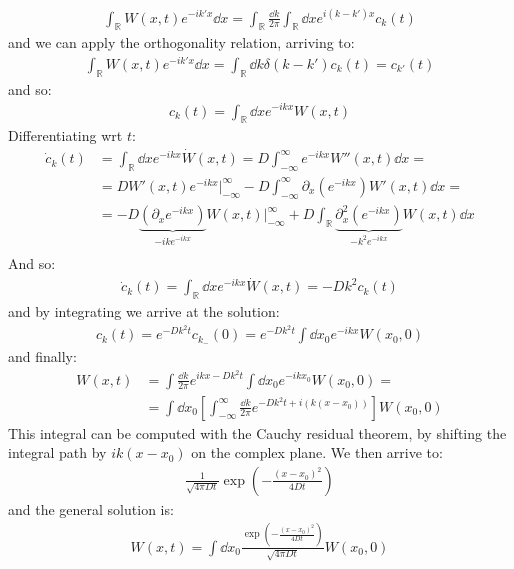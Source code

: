 \documentclass[../template.tex]{subfiles}
\begin{document}
\begin{align*}
    \int_{\mathbb{R}} W(x,t) e^{-ik'x} \dd{x} = \int_{\mathbb{R}} \frac{\dd{k}}{2\pi}  \int_{\mathbb{R}} \dd{x} e^{i(k-k')x} c_k(t)
\end{align*}  
and we can apply the orthogonality relation, arriving to:
\begin{align*}
    \int_{\mathbb{R}} W(x,t) e^{-ik'x}\dd{x} = \int_{\mathbb{R}} \dd{k} \delta(k-k') c_k(t) = c_{k'}(t)
\end{align*}
and so:
\begin{align*}
    c_k(t) = \int_{\mathbb{R}} \dd{x} e^{-ikx} W(x,t)
\end{align*}
Differentiating wrt $t$:
\begin{align*}
    \dot{c}_k(t) &= \int_{\mathbb{R}} \dd{x} e^{-ikx} \dot{W}(x,t) = D \int_{-\infty}^{\infty} e^{-ikx} W''(x,t) \dd{x} =  \\
    &= D W'(x,t) e^{-ikx}\big|_{-\infty}^{\infty} - D \int_{-\infty}^{\infty} \partial_x (e^{-ikx}) W'(x,t) \dd{x} = \\
    &= -D\underbrace{(\partial_x e^{-ikx})}_{-ik e^{-ikx}} W(x,t) \big|_{-\infty}^{\infty} + D\int_{\mathbb{R}} \underbrace{\partial_x^2 (e^{-ikx})}_{-k^2 e^{-ikx}} W(x,t) \dd{x} \\
\end{align*} 
And so:
\begin{align*}
    \dot{c}_k(t) = \int_{\mathbb{R}} \dd{x} e^{-ikx} \dot{W}(x,t) = - D k^2 c_k(t)
\end{align*}
and by integrating we arrive at the solution:
\begin{align*}
    c_k(t) = e^{-D k^2 t} c_{k_-}(0) = e^{-D k^2 t} \int \dd{x_0} e^{-ikx} W(x_0,0)
\end{align*}
and finally:
\begin{align*}
    W(x,t) &= \int \frac{\dd{k}}{2 \pi} e^{ikx - Dk^2 t} \int \dd{x_0} e^{-ik x_0} W(x_0, 0) =\\
    &= \int \dd{x_0} \left[\int_{-\infty}^{\infty}  \frac{\dd{k}}{2 \pi}  e^{-D k^2 t + i(k(x-x_0))}\right] W(x_0, 0)
\end{align*}
This integral can be computed with the Cauchy residual theorem, by shifting the integral path by $ik(x-x_0)$ on the complex plane. We then arrive to:
\begin{align*}
    \frac{1}{\sqrt{4 \pi D t}} \exp\left(-\frac{(x-x_0)^2}{4 D t} \right) 
\end{align*} 
and the general solution is:
\begin{align*}
    W(x,t) = \int \dd{x_0} \frac{\exp \left(-\frac{(x-x_0)^2}{4 D t} \right)}{\sqrt{4 \pi D t}} W(x_0, 0) 
\end{align*}
\end{document}
